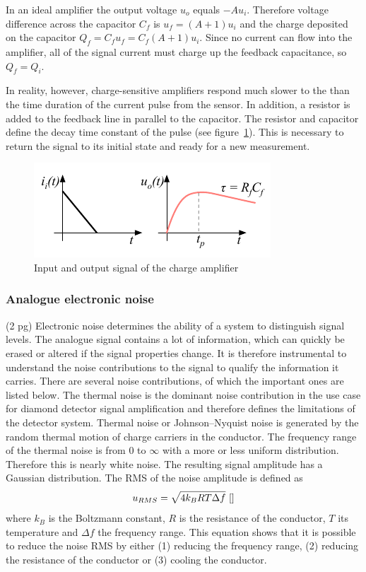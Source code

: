 \documentclass[12pt]{mytustyle}  %
\begin{document}
In an ideal amplifier the output voltage $u_o$ equals $-Au_i$. Therefore voltage difference across the capacitor $C_f$ is $u_f=(A+1)u_i$ and the charge deposited on the capacitor $Q_f=C_f u_f = C_f (A+1)u_i$. Since no current can flow into the amplifier, all of the signal current must charge up the feedback capacitance, so $Q_f = Q_i$.

In reality, however, charge-sensitive amplifiers respond much slower to the than the time duration of the current pulse from the sensor. In addition, a resistor is added to the feedback line in parallel to the capacitor. The resistor and capacitor define the decay time constant of the pulse (see figure~\ref{fig:chgrc}). This is necessary to return the signal to its initial state and ready for a new measurement.
\begin{figure}[!t]
\begin{center}
\includegraphics[width=0.45\linewidth]{plots/chgrc}
\caption{Input and output signal of the charge amplifier}
\label{fig:chgrc}
\end{center}
\end{figure}

\subsubsection{Analogue electronic noise}
(2 pg)
Electronic noise determines the ability of a system to distinguish signal levels. The analogue signal contains a lot of information, which can quickly be erased or altered if the signal properties change. It is therefore instrumental to understand the noise contributions to the signal to qualify the information it carries. There are several noise contributions, of which the important ones are listed below. The thermal noise is the dominant noise contribution in the use case for diamond detector signal amplification and therefore defines the limitations of the detector system. Thermal noise or Johnson--Nyquist noise is generated by the random thermal motion of charge carriers in the conductor. The frequency range of the thermal noise is from 0 to $\infty$ with a more or less uniform distribution. Therefore this is nearly white noise. The resulting signal amplitude has a Gaussian distribution. The RMS of the noise amplitude is defined as
\begin{equation}
\label{eq:thermnoise}
u_{RMS}=\sqrt{4k_BRT\Delta f}~\cite{}
\end{equation}
where $k_B$ is the Boltzmann constant, $R$ is the resistance of the conductor, $T$ its temperature and $\Delta f$ the frequency range. This equation shows that it is possible to reduce the noise RMS by either (1) reducing the frequency range, (2) reducing the resistance of the conductor or (3) cooling the conductor. 
\end{document}
